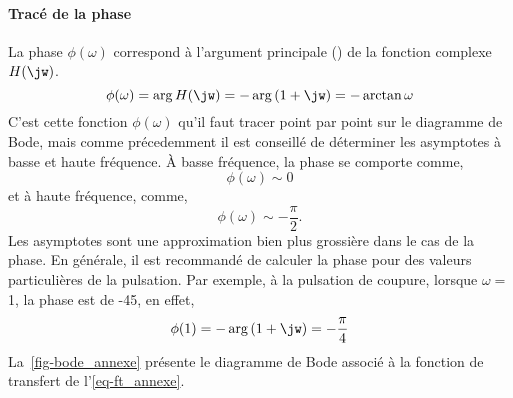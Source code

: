 \paragraph{Tracé de la phase}
La phase $\phi(\omega)$ correspond à l'argument principale () 
de la fonction complexe $H(\jw)$.
\[
\phi(\omega)=\arg{H(\jw)}=-\arg{(1+\jw)}=-\arctan{\omega}
\]
C'est cette fonction $\phi(\omega)$ qu'il faut tracer point par point 
sur le diagramme de Bode, mais comme précedemment
il est conseillé de déterminer les asymptotes à basse et haute fréquence.
\`A basse fréquence, la phase se comporte comme,
\[
\phi(\omega)\sim 0
\] 
et à haute fréquence, comme, 
\[
\phi(\omega)\sim -\dfrac{\pi}{2}.
\]
Les asymptotes sont une approximation bien plus 
grossière dans le cas de la phase. 
En générale, il est recommandé de 
calculer la phase pour des valeurs particulières de la 
pulsation. Par exemple, à la pulsation de coupure, 
lorsque $\omega=$1, la phase est de -45\degreeSI, en effet,
\[
\phi(1)=-\arg{(1+\jw)}=-\dfrac{\pi}{4}
\]
La~\cref{fig-bode_annexe} présente le diagramme de Bode associé à 
la fonction de transfert de l'\cref{eq-ft_annexe}.
